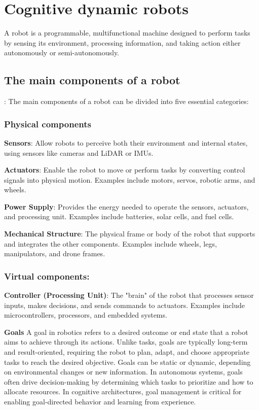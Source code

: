 \chapter{Cognitive dynamic robots}
A robot is a programmable, multifunctional machine designed to perform tasks by sensing its environment, processing information, and taking action either autonomously or semi-autonomously. 

\section{The main components of a robot}:
The main components of a robot can be divided into five essential categories:

    \subsection{Physical components}
        \textbf{Sensors}: Allow robots to perceive both their environment and internal states, using sensors like cameras and LiDAR or IMUs.

        \textbf{Actuators}: Enable the robot to move or perform tasks by converting control signals into physical motion.
        Examples include motors, servos, robotic arms, and wheels.

        \textbf{Power Supply}: Provides the energy needed to operate the sensors, actuators, and processing unit.
        Examples include batteries, solar cells, and fuel cells.

        \textbf{Mechanical Structure}: The physical frame or body of the robot that supports and integrates the other components.
        Examples include wheels, legs, manipulators, and drone frames.

    \subsection{Virtual components:}
        \textbf{Controller (Processing Unit)}: The "brain" of the robot that processes sensor inputs, makes decisions, and sends commands to actuators.
        Examples include microcontrollers, processors, and embedded systems.

        \textbf{Goals} A goal in robotics refers to a desired outcome or end state that a robot aims to achieve through its actions. Unlike tasks, goals are typically long-term and result-oriented, requiring the robot to plan, adapt, and choose appropriate tasks to reach the desired objective. Goals can be static or dynamic, depending on environmental changes or new information. In autonomous systems, goals often drive decision-making by determining which tasks to prioritize and how to allocate resources. In cognitive architectures, goal management is critical for enabling goal-directed behavior and learning from experience.
        




